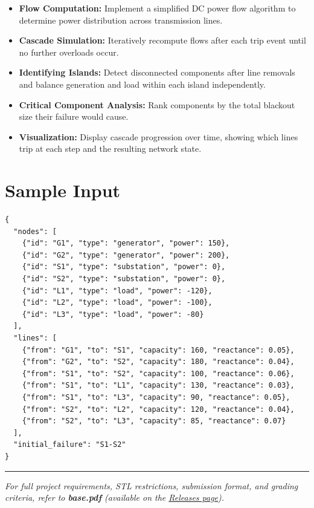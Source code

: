 \begin{itemize}
  \item \textbf{Flow Computation:} Implement a simplified DC power flow algorithm to determine power distribution across transmission lines.
  \item \textbf{Cascade Simulation:} Iteratively recompute flows after each trip event until no further overloads occur.
  \item \textbf{Identifying Islands:} Detect disconnected components after line removals and balance generation and load within each island independently.
  \item \textbf{Critical Component Analysis:} Rank components by the total blackout size their failure would cause.
  \item \textbf{Visualization:} Display cascade progression over time, showing which lines trip at each step and the resulting network state.
\end{itemize}

\section{Sample Input}

\begin{lstlisting}[style=json, caption={data/input\_sample.json}]
{
  "nodes": [
    {"id": "G1", "type": "generator", "power": 150},
    {"id": "G2", "type": "generator", "power": 200},
    {"id": "S1", "type": "substation", "power": 0},
    {"id": "S2", "type": "substation", "power": 0},
    {"id": "L1", "type": "load", "power": -120},
    {"id": "L2", "type": "load", "power": -100},
    {"id": "L3", "type": "load", "power": -80}
  ],
  "lines": [
    {"from": "G1", "to": "S1", "capacity": 160, "reactance": 0.05},
    {"from": "G2", "to": "S2", "capacity": 180, "reactance": 0.04},
    {"from": "S1", "to": "S2", "capacity": 100, "reactance": 0.06},
    {"from": "S1", "to": "L1", "capacity": 130, "reactance": 0.03},
    {"from": "S1", "to": "L3", "capacity": 90, "reactance": 0.05},
    {"from": "S2", "to": "L2", "capacity": 120, "reactance": 0.04},
    {"from": "S2", "to": "L3", "capacity": 85, "reactance": 0.07}
  ],
  "initial_failure": "S1-S2"
}
\end{lstlisting}

\vfill
\noindent\rule{\textwidth}{0.4pt}
{\small\textit{For full project requirements, STL restrictions, submission format, and grading criteria, refer to \textbf{base.pdf} (available on the \href{https://github.com/BestSithInEU/cse211-term-projects/releases}{Releases page}).}}
